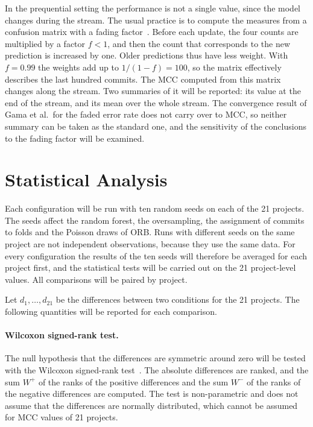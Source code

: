 \documentclass[12pt,a4paper,oneside]{report}
\begin{document}
In the prequential setting the performance is not a single value, since the
model changes during the stream. The usual practice is to compute the
measures from a confusion matrix with a fading
factor~\cite{gama2013prequential}. Before each update, the four counts are
multiplied by a factor $f < 1$, and then the count that corresponds to the new
prediction is increased by one. Older predictions thus have less weight. With
$f = 0.99$ the weights add up to $1/(1-f) = 100$, so the matrix effectively
describes the last hundred commits. The MCC computed from this matrix changes
along the stream. Two summaries of it will be reported: its value at the end
of the stream, and its mean over the whole stream. The convergence result of
Gama et al.\ for the faded error rate does not carry over to MCC, so neither
summary can be taken as the standard one, and the sensitivity of the
conclusions to the fading factor will be examined.

\section{Statistical Analysis}\label{sec:stats}

Each configuration will be run with ten random seeds on each of the 21
projects. The seeds affect the random forest, the oversampling, the
assignment of commits to folds and the Poisson draws of ORB. Runs with
different seeds on the same project are not independent observations, because
they use the same data. For every configuration the results of the ten seeds
will therefore be averaged for each project first, and the statistical tests
will be carried out on the 21 project-level values. All comparisons will be
paired by project.

Let $d_1,\dots,d_{21}$ be the differences between two conditions for the 21
projects. The following quantities will be reported for each comparison.

\paragraph{Wilcoxon signed-rank test.} The null hypothesis that the
differences are symmetric around zero will be tested with the Wilcoxon
signed-rank test~\cite{wilcoxon1945}. The absolute differences are ranked,
and the sum $W^{+}$ of the ranks of the positive differences and the sum
$W^{-}$ of the ranks of the negative differences are computed. The test is
non-parametric and does not assume that the differences are normally
distributed, which cannot be assumed for MCC values of 21 projects.
\end{document}

